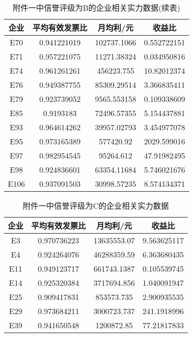 \documentclass{cumcmthesis}
\begin{document}
\begin{appendices}
\begin{table}[H]   %
	\caption{附件一中信誉评级为B的企业相关实力数据(续表)}\label{tab:002} \centering
	\begin{tabular}{cccc}
		\toprule[1.5pt]
		企业 & 平均有效发票比     & 月均利/元           & 收益比          \\
		\midrule[1pt]		
		E70  & 0.941221019 & 102737.1066  & 0.552722151  \\
		E71  & 0.957221075 & 11271.38324  & 0.034950816  \\
		E74  & 0.961261261 & 456223.755   & 10.82012374  \\
		E76  & 0.949387755 & 85309.29514  & 3.366835411  \\
		E79  & 0.923739052 & 9565.553158  & 0.109338609  \\
		E85  & 0.9193183   & 72496.57355  & 5.154437881  \\
		E93  & 0.964614262 & 39957.02793  & 3.454977078  \\
		E95  & 0.973165389 & 577420.92    & 2029.599016  \\
		E97  & 0.982954545 & 95264.612    & 47.91982495  \\
		E98  & 0.924836601 & 63354.11684  & 5.746021676  \\
		E106 & 0.937091503 & 30998.57235  & 8.574134371 \\
		\bottomrule[1.5pt]
	\end{tabular}
\end{table}

\begin{table}[H]   %
	\caption{附件一中信誉评级为C的企业相关实力数据}\label{tab:004} \centering
	\begin{tabular}{cccc}
		\toprule[1.5pt]
		企业 & 平均有效发票比     & 月均利/元           & 收益比          \\
		\midrule[1pt]
E3   & 0.970736223 & 13635553.07 & 9.563625117  \\
E4   & 0.924264076 & 46288359.59 & 6.363680435  \\
E11  & 0.949123717 & 661743.1387 & 0.105539745  \\
E14  & 0.925320384 & 3717694.856 & 1.040091947  \\
E25  & 0.909417831 & 853573.735  & 2.900935535  \\
E29  & 0.973684211 & 3000723.737 & 241.1918996  \\
E39  & 0.941650548 & 1200872.85  & 77.21817833  \\
		\bottomrule[1.5pt]
\end{tabular}
\end{table}


\end{appendices}
\end{document}
